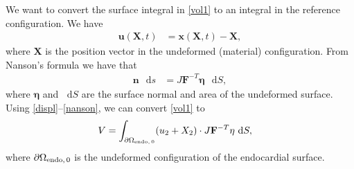 \documentclass[a4paper,10pt]{article}
\newcommand{\dif}{\mathop{}\!\mathrm{d}}
\newcommand{\ds}{\dif{}s}
\newcommand{\dS}{\dif{}S}
\begin{document}
We want to convert the surface integral in \eqref{vol1} to an
integral in the reference configuration. We have
\begin{align}
\mathbf{u}(\mathbf{X},t) &= \mathbf{x}(\mathbf{X},t)-\mathbf{X},
\label{displ}\end{align}
where $\mathbf{X}$ is the position vector in the undeformed (material) configuration.
From Nanson's formula we have that
\begin{align}
\mathbf{n} \, \ds &= J\mathbf{F}^{-T}\mathbf{\eta} \, \dS,
\label{nanson}\end{align}
where $\mathbf{\eta}$ and $\dS$ are the surface normal and area of the undeformed surface.
Using \eqref{displ}--\eqref{nanson}, we can convert \eqref{vol1} to
\begin{align}
V &=  \int_{\partial\Omega_{\rm endo,\, 0}}(u_2+X_2)\cdot
J\mathbf{F}^{-T}\mathbf{\eta} \, \dS ,
\label{vol2}\end{align}
where $\partial\Omega_{\rm endo,\, 0}$ is the undeformed configuration
of the endocardial surface.



\end{document}
